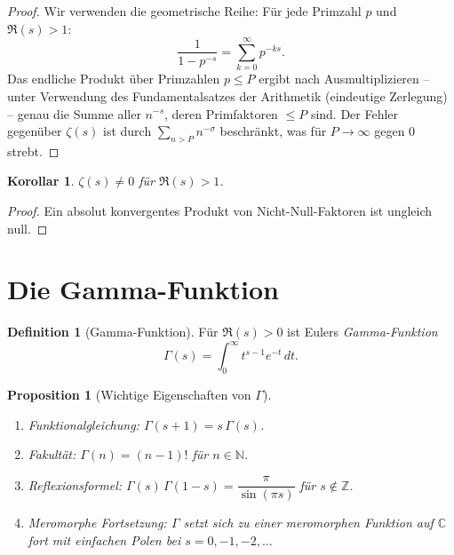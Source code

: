 \documentclass[12pt,a4paper]{amsart}
\newtheorem{corollary}[theorem]{Korollar}
\newtheorem{proposition}[theorem]{Proposition}
\theoremstyle{definition}
\newtheorem{definition}[theorem]{Definition}
\newcommand{\N}{\mathbb{N}}
\newcommand{\Z}{\mathbb{Z}}
\newcommand{\C}{\mathbb{C}}
\begin{document}
\begin{proof}
Wir verwenden die geometrische Reihe: F\"ur jede Primzahl $p$ und $\Re(s)>1$:
\[
  \frac{1}{1 - p^{-s}} = \sum_{k=0}^{\infty} p^{-ks}.
\]
Das endliche Produkt \"uber Primzahlen $p \le P$ ergibt nach Ausmultiplizieren
-- unter Verwendung des Fundamentalsatzes der Arithmetik (eindeutige
Zerlegung) -- genau die Summe aller $n^{-s}$, deren Primfaktoren $\le P$ sind.
Der Fehler gegen\"uber $\zeta(s)$ ist durch $\sum_{n>P} n^{-\sigma}$
beschr\"ankt, was f\"ur $P \to \infty$ gegen $0$ strebt.
\end{proof}

\begin{corollary}
$\zeta(s) \ne 0$ f\"ur $\Re(s) > 1$.
\end{corollary}

\begin{proof}
Ein absolut konvergentes Produkt von Nicht-Null-Faktoren ist ungleich null.
\end{proof}

\section{Die Gamma-Funktion}
\label{sec:gamma}

\begin{definition}[Gamma-Funktion]
\label{def:gamma}
F\"ur $\Re(s) > 0$ ist Eulers \emph{Gamma-Funktion}
\[
  \Gamma(s) = \int_0^{\infty} t^{s-1} e^{-t}\,dt.
\]
\end{definition}

\begin{proposition}[Wichtige Eigenschaften von $\Gamma$]
\label{prop:gamma_props}
\begin{enumerate}
  \item[\textup{(i)}] \textit{Funktionalgleichung:} $\Gamma(s+1) = s\,\Gamma(s)$.
  \item[\textup{(ii)}] \textit{Fakult\"at:} $\Gamma(n) = (n-1)!$ f\"ur $n \in \N$.
  \item[\textup{(iii)}] \textit{Reflexionsformel:}
    $\Gamma(s)\,\Gamma(1-s) = \dfrac{\pi}{\sin(\pi s)}$
    f\"ur $s \notin \Z$.
  \item[\textup{(iv)}] \textit{Meromorphe Fortsetzung:} $\Gamma$ setzt sich zu
    einer meromorphen Funktion auf $\C$ fort mit einfachen Polen bei
    $s = 0, -1, -2, \ldots$
\end{enumerate}
\end{proposition}
\end{document}
